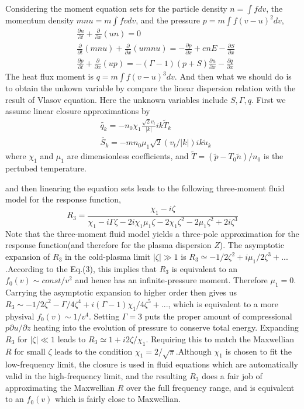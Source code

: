 \documentclass[11pt,a4paper]{article}
\begin{document}
	Considering the moment equation sets for the particle density $n=\int{f}dv$, the momentum density $mnu=m\int{fv}dv$, and the pressure $p=m\int{f(v-u)^2dv}$,
	\begin{equation}
	\begin{aligned}
	&\frac{\partial{n}}{\partial{t}}+\frac{\partial}{\partial{x}}(un)=0\\
	&\frac{\partial}{\partial{t}}(mnu)+\frac{\partial}{\partial{x}}(umnu)=-\frac{\partial{p}}{\partial{x}}+enE-\frac{\partial{S}}{\partial{x}}	\\
	&\frac{\partial{p}}{\partial{t}}+\frac{\partial}{\partial{x}}(up)=
	-(\Gamma-1)(p+S)\frac{\partial{u}}{\partial{x}}-\frac{\partial{q}}{\partial{x}}
	\end{aligned}
	\end{equation}
	The heat flux moment is $q=m\int{f(v-u)^3}dv$. And then what we should do is to obtain the unkown variable by compare the linear dispersion relation with the result of Vlasov equation. Here the unknown variables include $S,\Gamma,q$. First we assume linear closure approximations by 
	\begin{equation}
	\begin{aligned}
	&\tilde{q_k}=-n_0\chi_1\frac{\sqrt{2}v_t}{|k|}ik\tilde{T}_k	\\
	&\tilde{S_k}=-mn_0\mu_1\sqrt{2}(v_t/|k|)ik\tilde{u}_k
	\end{aligned}
	\end{equation}
	where $\chi_1$ and $\mu_1$ are dimensionless coefficients, and $\tilde{T}=(\tilde{p}-T_0\tilde{n})/n_0$ is the pertubed temperature.
	
	and then linearing the equation sets leads to the following three-moment fluid model for the response function, 
	\begin{equation}
		R_3=\frac{\chi_1-i\zeta}{\chi_1-i\Gamma\zeta-2i\chi_1\mu_1\zeta-2\chi_1\zeta^2-2\mu_1\zeta^2+2i\zeta^3}
	\end{equation}
	Note that the three-moment fluid model yields a three-pole approximation for the response function(and therefore for the plasma dispersion $Z$). The asymptotic expansion of $R_3$ in the cold-plasma limit $|\zeta|\gg{1}$ is $R_3\simeq -1/2\zeta^2+i\mu_1/2\zeta^3+...$.According to the Eq.(3), this implies that $R_3$ is equivalent to an $f_0(v)\sim const/v^2$ and hence has an infinite-pressure moment. Therefore $\mu_1=0$. Carrying the asymptotic expansion to higher order then gives us 
	$R_3\sim -1/2\zeta^2-\Gamma/4\zeta^4+i(\Gamma-1)\chi_1/4\zeta^5+...$, which is equivalent to a more physival $f_0(v)\sim 1/v^4$. Setting $\Gamma=3$ puts the proper amount of compressional $p\partial{u}/\partial{z}$ heating into the evolution of pressure to conserve total energy. Expanding $R_3$ for $|\zeta|\ll{1}$ leads to $R_3\simeq 1+i2\zeta/\chi_1$. Requiring this to match the Maxwellian $R$ for small $\zeta$ leads to the condition $\chi_1=2/\sqrt{\pi}$.Although $\chi_1$ is chosen to fit the low-frequency limit, the closure is used in fluid equations which are automatically valid in the high-frequency limit, and the resulting $R_3$ does a fair job of approximating the Maxwellian $R$ over the full frequency range, and is equivalent to an $f_0(v)$ which is fairly close to Maxwellian. 
	
\end{document}
